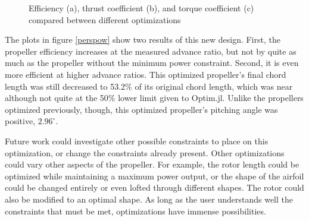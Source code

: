 \documentclass[journal ]{new-aiaa}
\begin{document}
\begin{figure}[H]
\centering

	\hspace{1em}
	\caption{Efficiency (a), thrust coefficient (b), and torque coefficient (c) compared between different optimizations}
	\captionsetup{aboveskip=0pt,font=it}
	\label{perspow}
\end{figure}

The plots in figure \eqref{perspow} show two results of this new design. First, the propeller efficiency increases at the measured advance ratio, but not by quite as much as the propeller without the minimum power constraint. Second, it is even more efficient at higher advance ratios. This optimized propeller's final chord length was still decreased to 53.2\% of its original chord length, which was near although not quite at the 50\% lower limit given to Optim.jl. Unlike the propellers optimized previously, though, this optimized propeller's pitching angle was positive, $2.96^{\circ}$.

Future work could investigate other possible constraints to place on this optimization, or change the constraints already present. Other optimizations could vary other aspects of the propeller. For example, the rotor length could be optimized while maintaining a maximum power output, or the shape of the airfoil could be changed entirely or even lofted through different shapes. The rotor could also be modified to an optimal shape. As long as the user understands well the constraints that must be met, optimizations have immense possibilities.
\end{document}
